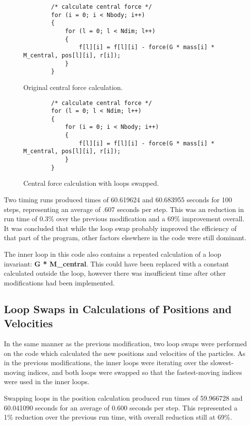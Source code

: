 \documentclass[11pt, oneside]{article}   %
\begin{document}
\begin{figure}
	\begin{lstlisting}
		/* calculate central force */
		for (i = 0; i < Nbody; i++)
		{
			for (l = 0; l < Ndim; l++)
			{
				f[l][i] = f[l][i] - force(G * mass[i] * M_central, pos[l][i], r[i]);
			}
		}
	\end{lstlisting}
	\caption{Original central force calculation.}
	\label{figure:CfOrig}
\end{figure}

\begin{figure}
	\begin{lstlisting}
		/* calculate central force */
		for (l = 0; l < Ndim; l++)
		{
			for (i = 0; i < Nbody; i++)
			{
				f[l][i] = f[l][i] - force(G * mass[i] * M_central, pos[l][i], r[i]);
			}
		}
	\end{lstlisting}
	\caption{Central force calculation with loops swapped.}
	\label{figure:CfMod}
\end{figure}

Two timing runs produced times of 60.619624 and 60.683955 seconds for 100 steps, representing an average of .607 seconds per step.
This was an reduction in run time of 0.3\% over the previous modification and a 69\% improvement overall.
It was concluded that while the loop swap probably improved the efficiency of that part of the program, other factors elsewhere in the code were still dominant.

The inner loop in this code also contains a repeated calculation of a loop invariant: \textbf{G * M\_central}.
This could have been replaced with a constant calculated outside the loop, however there was insufficient time after other modifications had been implemented.

\subsection{Loop Swaps in Calculations of Positions and Velocities}
In the same manner as the previous modification, two loop swaps were performed on the code which calculated the new positions and velocities of the particles.
As in the previous modifications, the inner loops were iterating over the slowest-moving indices, and both loops were swapped so that the fastest-moving indices were used in the inner loops. 

Swapping loops in the position calculation produced run times of 59.966728 and 60.041090 seconds for an average of 0.600 seconds per step.
This represented a 1\% reduction over the previous run time, with overall reduction still at 69\%.
\end{document}
